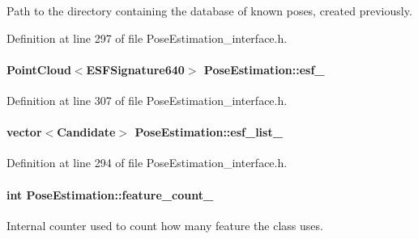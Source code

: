 Path to the directory containing the database of known poses, created previously. 



Definition at line 297 of file Pose\-Estimation\-\_\-interface.\-h.

\hypertarget{classPoseEstimation_ae5c93405275434048b7f81e64f1681d1}{
\paragraph[{esf\-\_\-}]{\setlength{\rightskip}{0pt plus 5cm}Point\-Cloud$<$E\-S\-F\-Signature640$>$ Pose\-Estimation\-::esf\-\_\-\hspace{0.3cm}{\ttfamily [private]}}}\label{classPoseEstimation_ae5c93405275434048b7f81e64f1681d1}


Definition at line 307 of file Pose\-Estimation\-\_\-interface.\-h.

\hypertarget{classPoseEstimation_a9c3ae4cf6ca9e28a2f715c4cf2974610}{
\paragraph[{esf\-\_\-list\-\_\-}]{\setlength{\rightskip}{0pt plus 5cm}vector$<${\bf Candidate}$>$ Pose\-Estimation\-::esf\-\_\-list\-\_\-\hspace{0.3cm}{\ttfamily [private]}}}\label{classPoseEstimation_a9c3ae4cf6ca9e28a2f715c4cf2974610}


Definition at line 294 of file Pose\-Estimation\-\_\-interface.\-h.

\hypertarget{classPoseEstimation_ade24adda1bd26f6bdf79b54088069d5d}{
\paragraph[{feature\-\_\-count\-\_\-}]{\setlength{\rightskip}{0pt plus 5cm}int Pose\-Estimation\-::feature\-\_\-count\-\_\-\hspace{0.3cm}{\ttfamily [private]}}}\label{classPoseEstimation_ade24adda1bd26f6bdf79b54088069d5d}


Internal counter used to count how many feature the class uses. 



